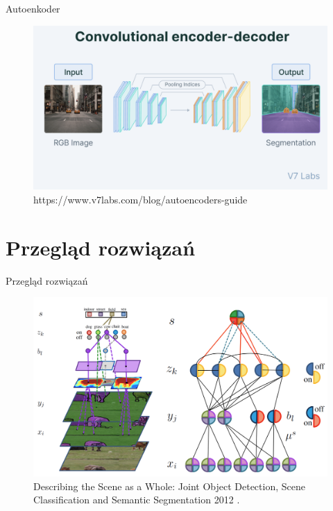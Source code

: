 \documentclass[10pt]{beamer}
\begin{document}
    \begin{frame}{Autoenkoder}
        \begin{figure}
            \includegraphics[width=\textwidth]{images/autoencoder.png}
            \caption{https://www.v7labs.com/blog/autoencoders-guide}
        \end{figure}
        
    \end{frame}
    \section[Przegląd rozwiązań]{Przegląd rozwiązań}
    \begin{frame}{Przegląd rozwiązań}
        
        \begin{figure}
            \includegraphics[width=\textwidth]{images/joint-segmentation-and-classification.png}
            \caption{Describing the Scene as a Whole: Joint Object Detection, Scene Classification and Semantic Segmentation 2012 \cite{yao2012describing}.}
        \end{figure}
    \end{frame}
    
\end{document}

